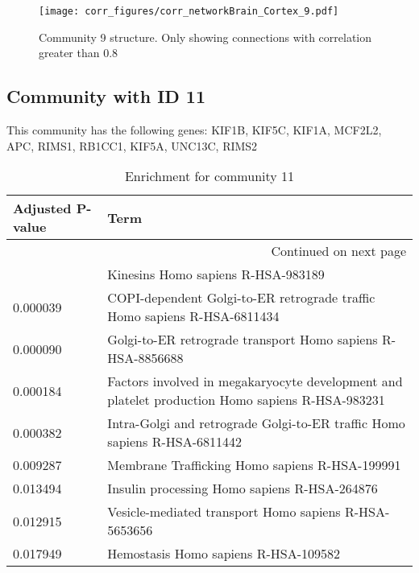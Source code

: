 \begin{figure}[h!]
\centering
\texttt{[image: corr\_figures/corr\_networkBrain\_Cortex\_9.pdf]}
\caption{Community 9 structure. Only showing connections with correlation greater than 0.8}
\end{figure}




\subsection*{Community with ID 11}
This community has the following genes: KIF1B, KIF5C, KIF1A, MCF2L2, APC, RIMS1, RB1CC1, KIF5A, UNC13C, RIMS2
\\
\begin{longtable}{p{2.4cm}p{14.5cm}}
\caption{Enrichment for community 11}\\
\toprule
Adjusted \newline P-value &                                                                                             Term \\
\midrule
\endhead
\midrule
\multicolumn{2}{r}{{Continued on next page}} \\
\midrule
\endfoot

\bottomrule
\endlastfoot
                 0.000006 &                                                               Kinesins Homo sapiens R-HSA-983189 \\
                 0.000039 &                         COPI-dependent Golgi-to-ER retrograde traffic Homo sapiens R-HSA-6811434 \\
                 0.000090 &                                      Golgi-to-ER retrograde transport Homo sapiens R-HSA-8856688 \\
                 0.000184 &  Factors involved in megakaryocyte development and platelet production Homo sapiens R-HSA-983231 \\
                 0.000382 &                        Intra-Golgi and retrograde Golgi-to-ER traffic Homo sapiens R-HSA-6811442 \\
                 0.009287 &                                                   Membrane Trafficking Homo sapiens R-HSA-199991 \\
                 0.013494 &                                                     Insulin processing Homo sapiens R-HSA-264876 \\
                 0.012915 &                                            Vesicle-mediated transport Homo sapiens R-HSA-5653656 \\
                 0.017949 &                                                             Hemostasis Homo sapiens R-HSA-109582 \\
\end{longtable}


